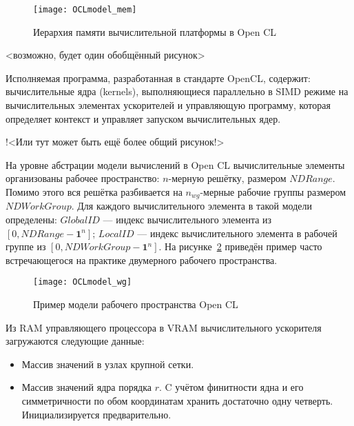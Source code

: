 \begin{figure}[h!]
  \centering
  \texttt{[image: OCLmodel\_mem]} 
  \caption{Иерархия памяти вычислительной платформы в Open CL}
  \label{fig:OCL_wg}
\end{figure}
\FloatBarrier

<возможно, будет один обобщённый рисунок>

Исполняемая программа, разработанная в стандарте OpenCL,
содержит:  
вычислительные ядра (kernels), выполняющиеся
параллельно 
в SIMD режиме 
на вычислительных элементах ускорителей
и управляющую программу, которая
определяет контекст и 
управляет запуском вычислительных ядер.

!<Или тут может быть ещё более общий рисунок!>



На уровне абстрации модели вычислений в Open CL
вычислительные элементы организованы рабочее пространство:
$n$-мерную решётку,
размером $NDRange$.
Помимо этого вся решётка разбивается на $n_{wg}$-мерные рабочие группы
размером $NDWorkGroup$. 
Для каждого вычислительного элемента в такой модели определены:  
$GlobalID$ %
--- индекс вычислительного элемента из $[0, NDRange - \mathbf{1}^n]$;
$LocalID$ --- индекс вычислительного элемента в рабочей группе
из $[0, NDWorkGroup - \mathbf{1}^n]$. 
На рисунке~\ref{fig:OCL_wg} приведён пример
часто встречающегося на практике двумерного рабочего пространства.

\begin{figure}[h!]
  \centering
  \texttt{[image: OCLmodel\_wg]} 
  \caption{Пример модели рабочего пространства Open CL}
  \label{fig:OCL_wg}
\end{figure}
\FloatBarrier


Из RAM управляющего процессора
в VRAM вычислительного ускорителя
загружаются следующие данные: 
\begin{itemize}
\item
  Массив значений в узлах крупной сетки. %
\item
  Массив значений ядра порядка $r$. %
  C учётом финитности ядна и его симметричности по
  обом координатам хранить достаточно одну четверть.
  Инициализируется предварительно.
\end{itemize}

